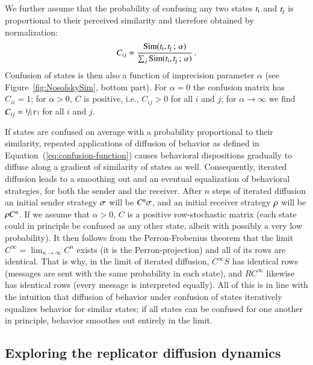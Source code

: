 \documentclass[fleqn,reqno,10pt]{article}
\newcommand{\impairment}{\ensuremath{\alpha}} %
\newcommand{\similarity}{\ensuremath{\mathrm{Sim}}} %
\begin{document}
We further assume that the probability of confusing any two states
$t_{\mathrm{i}}$ and $t_{\mathrm{j}}$ is proportional to their perceived
similarity and therefore obtained by normalization:
\begin{align*}
  C_{ij} = \frac{\similarity(\mystate{i}, \mystate{j} \myts ; \myts
  \impairment)} {\sum_j \similarity(\mystate{i}, \mystate{j} \myts ; \myts
  \impairment)} \,.
\end{align*}
Confusion of states is then also a function of imprecision parameter
$\impairment$ (see Figure~\ref{fig:NosofskySim}, bottom part). For $\impairment
= 0$ the confusion matrix has $C_{ii} = 1$; for $\impairment > 0$, $C$ is
positive, i.e., $C_{ij} >0$ for all $i$ and $j$; for $\impairment
\rightarrow \infty$ we find $C_{ij} = \nicefrac{1}{\left \lvert \, T \, \right\rvert}$ for all
$i$ and $j$.

If states are confused on average with a probability proportional to
their similarity, repeated applications of diffusion of behavior as
defined in Equation~(\ref{eq:confusion-function}) causes behavioral
dispositions gradually to diffuse along a gradient of similarity of
states as well. Consequently, iterated diffusion leads to a smoothing
out and an eventual equalization of behavioral strategies, for both
the sender and the receiver. After $n$ steps of iterated diffusion an
initial sender strategy $\sigma$ will be $C^n \sigma$, and an
initial receiver strategy $\rho$ will be $\rho C^n$. If we
assume that $\impairment > 0$, $C$ is a positive row-stochastic matrix
(each state could in principle be confused as any other state, albeit
with possibly a very low probability). It then follows from the
Perron-Frobenius theorem that the limit $C^\infty = \lim_{n
  \rightarrow \infty} C^n$ exists (it is the Perron-projection) and
all of its rows are identical. That is why, in the limit of iterated
diffusion, $C^\infty S$ has identical rows (messages are sent with the
same probability in each state), and $R C^\infty$ likewise has
identical rows (every message is interpreted equally). All of this is
in line with the intuition that diffusion of behavior under confusion
of states iteratively equalizes behavior for similar states; if all
states can be confused for one another in principle, behavior smoothes
out entirely in the limit.

\subsection{Exploring the replicator diffusion dynamics}
\label{sec:simulations}
\end{document}
